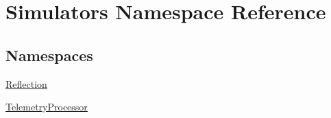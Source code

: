 \hypertarget{namespace_simulators}{}\section{Simulators Namespace Reference}
\label{namespace_simulators}
\subsection*{Namespaces}
\begin{DoxyCompactItemize}
\item 
 \hyperlink{namespace_simulators_1_1_reflection}{Reflection}
\item 
 \hyperlink{namespace_simulators_1_1_telemetry_processor}{Telemetry\+Processor}
\end{DoxyCompactItemize}
